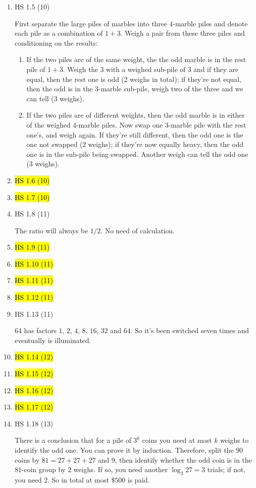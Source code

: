\documentclass[11pt]{article}
\newcommand{\bs}{\boldsymbol}
\newenvironment{note}{\begin{enumerate}[leftmargin=1em,topsep=0pt,noitemsep]}{\end{enumerate}}
\newenvironment{nnote}{\begin{enumerate}[leftmargin=.95em,topsep=0pt,noitemsep,label=$\bs{\cdot}$]}{\end{enumerate}}
\newcommand{\solution}{\boxed{\textbf{SOLUTION}}\hspace{.5em}}
\begin{document}
\begin{spacing}{1.1}
\begin{note}
\item HS 1.5 (10)

\solution First separate the large piles of marbles into three $4$-marble piles and denote each pile as a combination of $1+3$. Weigh a pair from these three piles and conditioning on the results:
\begin{nnote}
\item If the two piles are of the same weight, the the odd marble is in the rest pile of $1+3$. Weigh the $3$ with a weighed sub-pile of $3$ and if they are equal, then the rest one is odd (2 weighs in total); if they're not equal, then the odd is in the $3$-marble sub-pile, weigh two of the three and we can tell (3 weighs).
\item If the two piles are of different weights, then the odd marble is in either of the weighed $4$-marble piles. Now swap one $3$-marble pile with the rest one's, and weigh again. If they're still different, then the odd one is the one not swapped (2 weighs); if they're now equally heavy, then the odd one is in the sub-pile being swapped. Another weigh can tell the odd one (3 weighs).
\end{nnote}

\item \hl{HS 1.6 (10)}
\item \hl{HS 1.7 (10)}

\item HS 1.8 (11)

\solution The ratio will always be $1/2$. No need of calculation.

\item \hl{HS 1.9 (11)}
\item \hl{HS 1.10 (11)}
\item \hl{HS 1.11 (11)}
\item \hl{HS 1.12 (11)}

\item HS 1.13 (11)

\solution $64$ has factors $1$, $2$, $4$, $8$, $16$, $32$ and $64$. So it's been switched seven times and eventually is illuminated.

\item \hl{HS 1.14 (12)}
\item \hl{HS 1.15 (12)}
\item \hl{HS 1.16 (12)}
\item \hl{HS 1.17 (12)}

\item HS 1.18 (13)

\solution There is a conclusion that for a pile of $3^k$ coins you need at most $k$ weighs to identify the odd one. You can prove it by induction. Therefore, split the $90$ coins by $81=27+27+27$ and $9$, then identify whether the odd coin is in the $81$-coin group by $2$ weighs. If so, you need another $\log_3 27=3$ trials; if not, you need $2$. So in total at most $\$500$ is paid.


\end{note}
\end{spacing}
\end{document}
